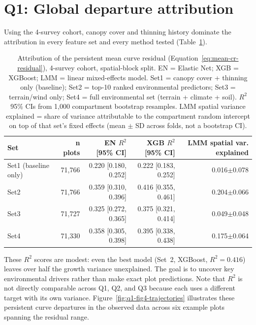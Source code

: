 \documentclass[logo,msc,ai]{infthesis}           %
\begin{document}
\section{Q1: Global departure attribution}
Using the 4-survey cohort, canopy cover and thinning history dominate the attribution in every feature set and every method tested (Table~\ref{tab:results-q1}).
\begin{table}[H]
\centering
\scriptsize
\renewcommand{\arraystretch}{1.2}
\begin{tabular*}{\textwidth}{@{\extracolsep{\fill}}lrrrr@{}}
\toprule
Set & n plots & EN $R^2$ [95\% CI] & XGB $R^2$ [95\% CI] & LMM spatial var. explained \\
\midrule
Set1 (baseline only) & 71{,}766 & 0.220 [0.180, 0.252] & 0.222 [0.183, 0.252] & 0.016$\pm$0.078 \\
Set2 & 71{,}766 & 0.359 [0.310, 0.396] & 0.416 [0.355, 0.461] & 0.204$\pm$0.066 \\
Set3 & 71{,}727 & 0.325 [0.272, 0.365] & 0.375 [0.321, 0.414] & 0.049$\pm$0.048 \\
Set4 & 71{,}330 & 0.358 [0.305, 0.398] & 0.395 [0.338, 0.438] & 0.175$\pm$0.064 \\
\bottomrule
\end{tabular*}
\caption{\footnotesize{Attribution of the persistent mean curve residual (Equation~\ref{eq:mean-cr-residual}),
4-survey cohort, spatial-block split. EN = Elastic Net; XGB = XGBoost; LMM = linear mixed-effects model.
Set1 = canopy cover + thinning only (baseline); Set2 = top-10 ranked environmental predictors; Set3 =
terrain/wind only; Set4 = full environmental set (terrain + climate + soil). $R^2$ 95\% CIs from 1,000
compartment bootstrap resamples. LMM spatial variance explained = share of variance attributable to the
compartment random intercept on top of that set's fixed effects (mean $\pm$ SD across folds, not a
bootstrap CI).}}
\label{tab:results-q1}
\end{table}

These $R^2$ scores are modest: even the best model (Set~2, XGBoost, $R^2=0.416$) leaves over half the growth variance unexplained. The goal is to uncover key environmental drivers rather than make exact plot predictions. Note that $R^2$ is not directly comparable across Q1, Q2, and Q3 because each uses a different target with its own variance. Figure~\ref{fig:q1-fig4-trajectories} illustrates these persistent curve departures in the observed data across six example plots spanning the residual range.
\end{document}
